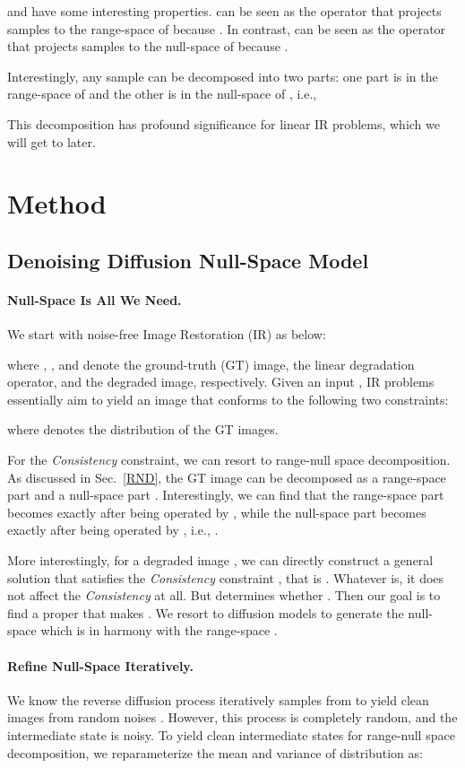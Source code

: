 \documentclass{article} \usepackage{iclr2023_conference,times}
\begin{document}
 and  have some interesting properties.  can be seen as the operator that projects samples  to the range-space of  because . In contrast,  can be seen as the operator that projects samples  to the null-space of  because .

Interestingly, any sample  can be decomposed into two parts: one part is in the range-space of  and the other is in the null-space of , i.e.,

This decomposition has profound significance for linear IR problems, which we will get to later.


\section{Method}
\subsection{Denoising Diffusion Null-Space Model}
\paragraph{Null-Space Is All We Need.} We start with noise-free Image Restoration (IR) as below:

where , , and  denote the ground-truth (GT) image, the linear degradation operator, and the degraded image, respectively. Given an input , IR problems essentially aim to yield an image  that conforms to the following two constraints:

where  denotes the distribution of the GT images.

For the \textit{Consistency} constraint, we can resort to range-null space decomposition. As discussed in Sec.~\ref{RND}, the GT image  can be decomposed as a range-space part  and a null-space part . Interestingly, we can find that the range-space part  becomes exactly  after being operated by , while the null-space part  becomes exactly  after being operated by , i.e., .

More interestingly, for a degraded image , we can directly construct a general solution  that satisfies the \textit{Consistency} constraint , that is . Whatever  is, it does not affect the \textit{Consistency} at all. But  determines whether . Then our goal is to find a proper  that makes . We resort to diffusion models to generate the null-space  
which is in harmony with the range-space .

\paragraph{Refine Null-Space Iteratively.} We know the reverse diffusion process iteratively samples  from  to yield clean images  from random noises . However, this process is completely random, and the intermediate state  is noisy. To yield clean intermediate states for range-null space decomposition, we reparameterize the mean  and variance  of distribution  as: 
\end{document}
